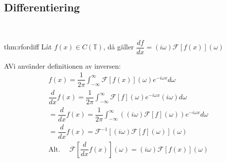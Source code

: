 \subsection{Differentiering}\hfill\\\par
\begin{theo}[Differentiering]{thm:rfordiff}
  Låt $f(x)\in C(\mathbb{T})$, då gäller $\dfrac{df}{dx} = (i\omega)\mathcal{F}\left[f(x)\right](\omega)$
\end{theo}
\par\bigskip
\begin{prf}
  AVi använder definitionen av inversen:
  \begin{equation*}
    \begin{gathered}
      f(x) = \dfrac{1}{2\pi}\int_{-\infty}^{\infty}\mathcal{F}\left[f(x)\right](\omega)e^{-i\omega x}d\omega\\
      \dfrac{d}{dx}f(x) = \dfrac{1}{2\pi}\int_{-\infty}^{\infty}\mathcal{F}\left[f\right](\omega)e^{-i\omega x}(i\omega)d\omega\\
      = \dfrac{d}{dx}f(x) = \dfrac{1}{2\pi}\int_{-\infty}^{\infty}\left((i\omega)\mathcal{F}\left[f\right](\omega)\right)e^{-i\omega x}d\omega\\
      = \dfrac{d}{dx}f(x) = \mathcal{F}^{-1}\left[(i\omega)\mathcal{F}\left[f\right](\omega)\right](\omega)\\
      \text{Alt. }\quad\mathcal{F}\left[\dfrac{d}{dx}f(x)\right](\omega) = (i\omega)\mathcal{F}\left[f(x)\right](\omega)
    \end{gathered}
  \end{equation*}
\end{prf}
